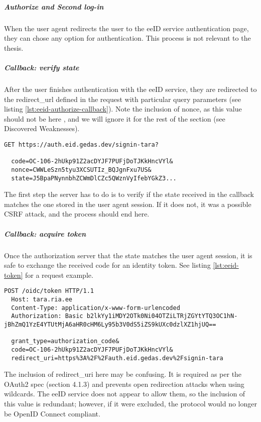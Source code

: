 \subparagraph{Authorize and Second log-in}

When the user agent redirects the user to the eeID service authentication page, they can chose any option for authentication. This process is not relevant to the thesis.

\subparagraph{Callback: verify state}

After the user finishes authentication with the eeID service, they are redirected to the redirect\_url defined in the request with particular query parameters (see listing \ref{lst:eeid-authorize-callback}). Note the inclusion of nonce, as this value should not be here \cite{okta-oidc-spec}, and we will ignore it for the rest of the section (see Discovered Weaknesses).

\begin{lstlisting}[caption={The eeID service authorize redirect response}, label={lst:eeid-authorize-callback}]
  GET https://auth.eid.gedas.dev/signin-tara?
  
  code=OC-106-2hUkp91Z2acDYJF7PUFjDoTJKkHncVYl&
  nonce=CWWLeSzn5tyu3XCSUTIz_BQJgnFxu7US&
  state=J5BpaPNynnbhZCWmDlCZc5QWznVyIfebYGkZ3...
\end{lstlisting}

The first step the server has to do is to verify if the state received in the callback matches the one stored in the user agent session. If it does not, it was a possible CSRF attack, and the process should end here.

\subparagraph{Callback: acquire token}

Once the authorization server that the state matches the user agent session, it is safe to exchange the received code for an identity token. See listing \ref{lst:eeid-token} for a request example.

\begin{lstlisting}[caption={The eeID service token request}, label={lst:eeid-token}]
  POST /oidc/token HTTP/1.1
  Host: tara.ria.ee
  Content-Type: application/x-www-form-urlencoded
  Authorization: Basic b2lkYy1iMDY2OTk0Ni04OTZiLTRjZGYtYTQ3OC1hN-jBhZmQ1YzE4YTUtMjA6aHR0cHM6Ly95b3V0dS5iZS9kUXc0dzlXZ1hjUQ==

  grant_type=authorization_code&
  code=OC-106-2hUkp91Z2acDYJF7PUFjDoTJKkHncVYl&
  redirect_uri=https%3A%2F%2Fauth.eid.gedas.dev%2Fsignin-tara
\end{lstlisting}

The inclusion of redirect\_uri here may be confusing. It is required as per the OAuth2 spec (section 4.1.3) \cite{rfc6749} and prevents open redirection attacks when using wildcards. The eeID service does not appear to allow them, so the inclusion of this value is redundant; however, if it were excluded, the protocol would no longer be OpenID Connect compliant.

